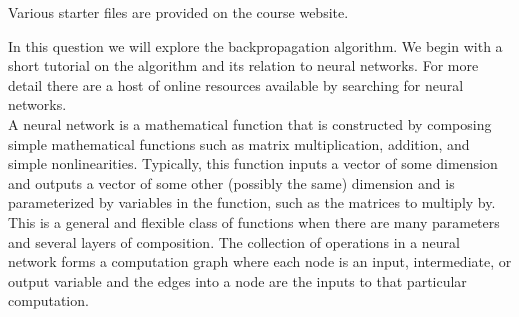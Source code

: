 \documentclass{article}
\begin{document}
Various starter files are provided on the course website.  








In this question we will explore the backpropagation algorithm.
We begin with a short tutorial on the algorithm and its relation to neural networks.
For more detail there are a host of online resources available by searching for neural networks.
\\


A neural network is a mathematical function that is constructed by composing simple mathematical functions such as matrix multiplication, addition, and simple nonlinearities.
Typically, this function inputs a vector of some dimension and outputs a vector of some other (possibly the same) dimension and is parameterized by variables in the function, such as the matrices to multiply by.
This is a general and flexible class of functions when there are many parameters and several layers of composition.
The collection of operations in a neural network forms a computation graph where each node is an input, intermediate, or output variable and the edges into a node are the inputs to that particular computation.
\\
\end{document}
